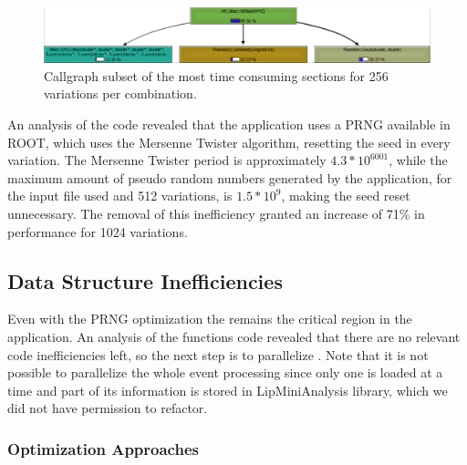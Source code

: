 \begin{figure}[!htp]
	\begin{center}
		\includegraphics[scale=0.33]{images/prng_256.png}
		\caption{Callgraph subset of the \ttDilepKinFit most time consuming sections for 256 variations per combination.}
		\label{fig:prng256}
	\end{center}
\end{figure}

An analysis of the code revealed that the application uses a PRNG available in ROOT, which uses the Mersenne Twister algorithm, resetting the seed in every variation. The Mersenne Twister period is approximately $4.3 * 10^{6001}$, while the maximum amount of pseudo random numbers generated by the application, for the input file used and 512 variations, is $1.5 * 10^9$, making the seed reset unnecessary. The removal of this inefficiency granted an increase of 71\% in performance for 1024 variations.


\subsection{Data Structure Inefficiencies}

Even with the PRNG optimization the \ttDilepKinFit remains the critical region in the application. An analysis of the functions code revealed that there are no relevant code inefficiencies left, so the next step is to parallelize \ttDilepKinFit. Note that it is not possible to parallelize the whole event processing since only one is loaded at a time and part of its information is stored in LipMiniAnalysis library, which we did not have permission to refactor.

\subsubsection*{Optimization Approaches}

